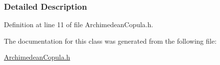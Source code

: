 \subsubsection{Detailed Description}


Definition at line 11 of file Archimedean\+Copula.\+h.



The documentation for this class was generated from the following file\+:\begin{DoxyCompactItemize}
\item 
\hyperlink{ArchimedeanCopula_8h}{Archimedean\+Copula.\+h}\end{DoxyCompactItemize}
